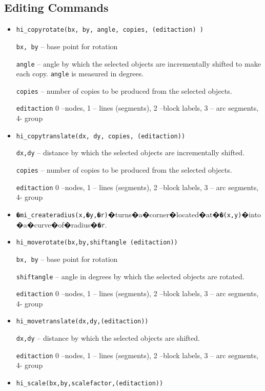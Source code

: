 \subsection{Editing Commands}
\begin{itemize}

\item \texttt{hi\_copyrotate(bx, by, angle, copies, (editaction) )}

\texttt{bx, by} -- base point for rotation

\texttt{angle} -- angle by which the selected objects are incrementally
shifted to make each copy. \texttt{angle} is measured in degrees.

\texttt{copies} -- number of copies to be produced from the selected
objects.

\texttt{editaction} 0 --nodes, 1 -- lines (segments), 2 --block labels, 3 --
arc segments, 4- group

\item \texttt{hi\_copytranslate(dx, dy, copies, (editaction))}

\texttt{dx,dy} -- distance by which the selected objects are incrementally
shifted.

\texttt{copies} -- number of copies to be produced from the selected
objects.

\texttt{editaction} 0 --nodes, 1 -- lines (segments), 2 --block labels, 3 --
arc segments, 4- group

\item{\tt�mi\_createradius(x,�y,�r)}�turns�a�corner�located�at�{\tt�(x,y)}�into�a�curve�of�radius�{\tt�r}.

\item \texttt{hi\_moverotate(bx,by,shiftangle (editaction))}

\texttt{bx, by} -- base point for rotation

\texttt{shiftangle} -- angle in degrees by which the selected objects are
rotated.

\texttt{editaction} 0 --nodes, 1 -- lines (segments), 2 --block labels, 3 --
arc segments, 4- group

\item \texttt{hi\_movetranslate(dx,dy,(editaction))}

\texttt{dx,dy} -- distance by which the selected objects are shifted.

\texttt{editaction} 0 --nodes, 1 -- lines (segments), 2 --block labels, 3 --
arc segments, 4- group

\item \texttt{hi\_scale(bx,by,scalefactor,(editaction))}


\end{itemize}
